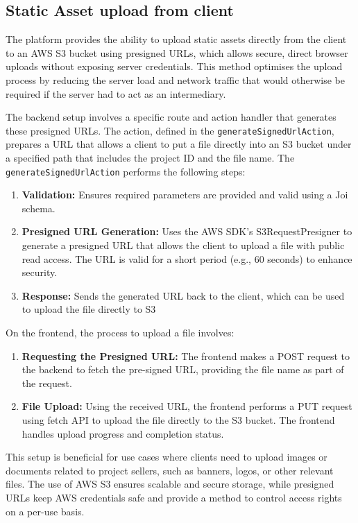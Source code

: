 \subsection{Static Asset upload from client}
The platform provides the ability to upload static assets directly from the client to an AWS S3 bucket using presigned URLs, which allows secure, direct browser uploads without exposing server credentials. 
This method optimises the upload process by reducing the server load and network traffic that would otherwise be required if the server had to act as an intermediary.

The backend setup involves a specific route and action handler that generates these presigned URLs. The action, defined in the \texttt{generateSignedUrlAction}, prepares a URL that allows a client to put a file directly into an S3 bucket under a specified path that includes the project ID and the file name.
The \texttt{generateSignedUrlAction} performs the following steps:
\begin{enumerate}
    \item \textbf{Validation:} Ensures required parameters are provided and valid using a Joi schema.
    \item \textbf{Presigned URL Generation:} Uses the AWS SDK's S3RequestPresigner to generate a presigned URL that allows the client to upload a file with public read access. The URL is valid for a short period (e.g., 60 seconds) to enhance security.
    \item \textbf{Response:} Sends the generated URL back to the client, which can be used to upload the file directly to S3
\end{enumerate}

On the frontend, the process to upload a file involves:
\begin{enumerate}
    \item \textbf{Requesting the Presigned URL:} The frontend makes a POST request to the backend to fetch the pre-signed URL, providing the file name as part of the request.
    \item \textbf{File Upload:} Using the received URL, the frontend performs a PUT request using fetch API to upload the file directly to the S3 bucket. The frontend handles upload progress and completion status.
\end{enumerate}

This setup is beneficial for use cases where clients need to upload images or documents related to project sellers, such as banners, logos, or other relevant files. 
The use of AWS S3 ensures scalable and secure storage, while presigned URLs keep AWS credentials safe and provide a method to control access rights on a per-use basis.


